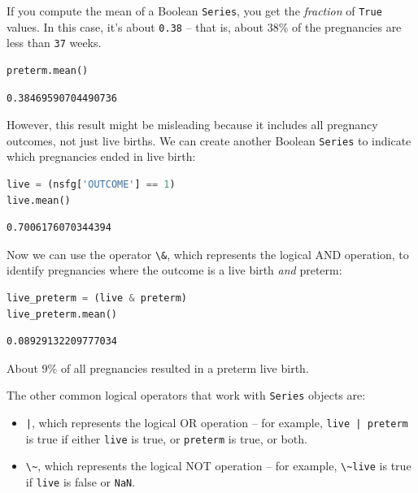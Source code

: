 If you compute the mean of a Boolean \passthrough{\lstinline!Series!},
you get the \emph{fraction} of \passthrough{\lstinline!True!} values. In
this case, it's about \passthrough{\lstinline!0.38!} -- that is, about
38\% of the pregnancies are less than \passthrough{\lstinline!37!}
weeks.

\begin{lstlisting}[language=Python,style=source]
preterm.mean()
\end{lstlisting}

\begin{lstlisting}[style=output]
0.38469590704490736
\end{lstlisting}

However, this result might be misleading because it includes all
pregnancy outcomes, not just live births. We can create another Boolean
\passthrough{\lstinline!Series!} to indicate which pregnancies ended in
live birth:

\begin{lstlisting}[language=Python,style=source]
live = (nsfg['OUTCOME'] == 1)
live.mean()
\end{lstlisting}

\begin{lstlisting}[style=output]
0.7006176070344394
\end{lstlisting}

Now we can use the operator \passthrough{\lstinline!\&!}, which
represents the logical AND operation, to identify pregnancies where the
outcome is a live birth \emph{and} preterm:

\begin{lstlisting}[language=Python,style=source]
live_preterm = (live & preterm)
live_preterm.mean()
\end{lstlisting}

\begin{lstlisting}[style=output]
0.08929132209777034
\end{lstlisting}

About \(9\%\) of all pregnancies resulted in a preterm live birth.

The other common logical operators that work with
\passthrough{\lstinline!Series!} objects are:

\begin{itemize}
\item
  \passthrough{\lstinline!|!}, which represents the logical OR operation
  -- for example, \passthrough{\lstinline!live | preterm!} is true if
  either \passthrough{\lstinline!live!} is true, or
  \passthrough{\lstinline!preterm!} is true, or both.
\item
  \passthrough{\lstinline!\~!}, which represents the logical NOT
  operation -- for example, \passthrough{\lstinline!\~live!} is true if
  \passthrough{\lstinline!live!} is false or
  \passthrough{\lstinline!NaN!}.
\end{itemize}

